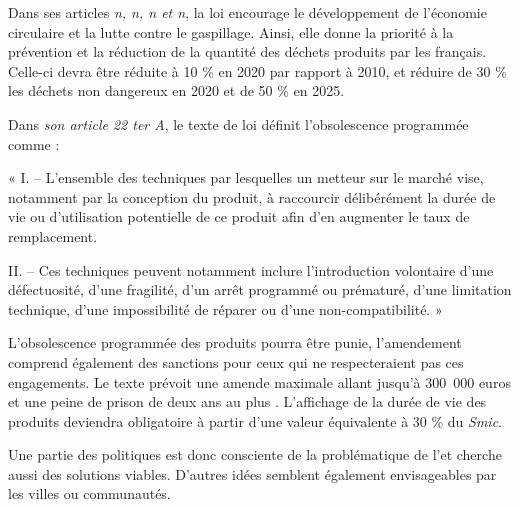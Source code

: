 \bigbreak
Dans ses articles \textit{n, n, n et n}, la loi encourage le développement de l’économie circulaire et la lutte contre le gaspillage. Ainsi, elle donne la priorité à la prévention et la réduction de la quantité des déchets produits par les français. Celle-ci devra être réduite à 10 \%  en 2020 par rapport à 2010, et réduire de 30 \% les déchets non dangereux en 2020 et de 50 \% en 2025.


\bigbreak
Dans \textit{son article 22 ter A}, le texte de loi définit l’obsolescence programmée comme :

\begin{itshape}« I. – L’ensemble des techniques par lesquelles un metteur sur le marché vise, notamment par la conception du produit, à raccourcir délibérément la durée de vie ou d’utilisation potentielle de ce produit afin d’en augmenter le taux de remplacement.

II. – Ces techniques peuvent notamment inclure l’introduction volontaire d’une défectuosité, d’une fragilité, d’un arrêt programmé ou prématuré, d’une limitation technique, d’une impossibilité de réparer ou d’une non-compatibilité. »
\end{itshape}

\bigbreak
L’obsolescence programmée des produits pourra être punie, l’amendement comprend également des sanctions pour ceux qui ne respecteraient pas ces engagements. Le texte prévoit une amende maximale allant jusqu'à 300~000 euros et une peine de prison de deux ans au plus \cite{sanctionloi}. L'affichage de la durée de vie des produits deviendra obligatoire à partir d'une valeur équivalente à 30 \% du \textit{Smic}.


Une partie des politiques est donc consciente de la problématique de l'\op et cherche aussi des solutions viables. D'autres idées semblent également envisageables par les villes ou communautés.

